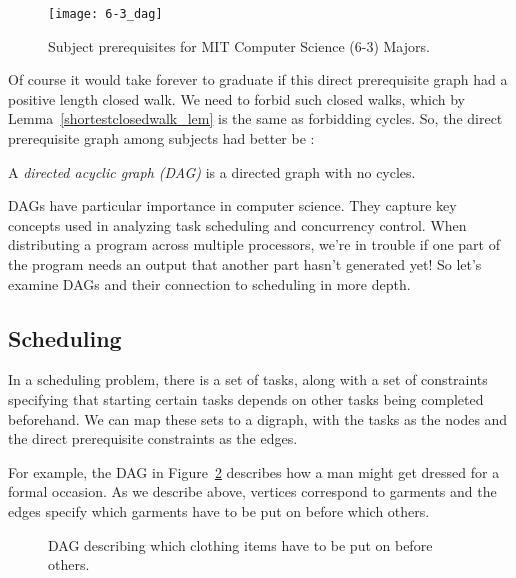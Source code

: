 \begin{figure}

\texttt{[image: 6-3\_dag]}

\caption{Subject prerequisites for MIT Computer Science (6-3) Majors.}

\label{6-3_subjects}

\end{figure}

Of course it would take forever to graduate if this direct prerequisite
graph had a positive length closed walk.  We need to forbid such
closed walks, which by Lemma~\ref{shortestclosedwalk_lem} is the same
as forbidding cycles.  So, the direct prerequisite
graph among subjects had better be :

\begin{definition}
A \emph{directed acyclic graph (DAG)}%
%
is a directed graph with no cycles.
\end{definition}

DAGs have particular importance in computer science.  They capture key
concepts used in analyzing task scheduling and concurrency control.
When distributing a program across multiple processors, we're in
trouble if one part of the program needs an output that another part
hasn't generated yet!  So let's examine DAGs and their connection to
scheduling in more depth.

\iffalse
We won't be working on any examples quite so
technical in this chapter, but\fi


\subsection{Scheduling}\label{sched_subsec}

In a scheduling problem, there is a set of tasks, along with a set of
constraints specifying that starting certain tasks depends on other
tasks being completed beforehand.  We can map these sets to a digraph,
with the tasks as the nodes and the direct prerequisite constraints as
the edges.

For example, the DAG in Figure~\ref{fig:7FP} describes how a man might
get dressed for a formal occasion.  As we describe above, vertices
correspond to garments and the edges specify which garments have to be
put on before which others.

\begin{figure}


\caption{DAG describing which clothing items have to be put on before others.}

\label{fig:7FP}

\end{figure}

